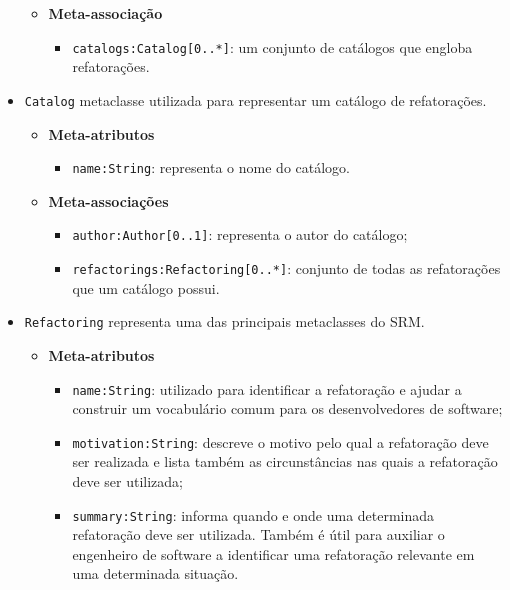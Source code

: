 \begin{itemize}
\begin{itemize}
	\item \textbf{Meta-associação}
		\begin{itemize}
			\item \texttt{catalogs:Catalog[0..*]}: um conjunto de catálogos que engloba refatorações.
		\end{itemize}	
\end{itemize} 

\item \texttt{Catalog} metaclasse utilizada para representar um catálogo de refatorações.

\begin{itemize}
	\item \textbf{Meta-atributos}
		\begin{itemize}
			\item \texttt{name:String}: representa o nome do catálogo. 
		\end{itemize}	
\end{itemize} 

\begin{itemize}
	\item \textbf{Meta-associações}
		\begin{itemize}
			\item \texttt{author:Author[0..1]}: representa o autor do catálogo;
			\item \texttt{refactorings:Refactoring[0..*]}: conjunto de todas as refatorações que um catálogo possui.
		\end{itemize}	
\end{itemize} 

\item \texttt{Refactoring} representa uma das principais metaclasses do SRM.

\begin{itemize}
	\item \textbf{Meta-atributos}
		\begin{itemize}
			\item \texttt{name:String}: utilizado para identificar a refatoração e ajudar a construir um vocabulário comum para os desenvolvedores de software;
			\item \texttt{motivation:String}: descreve o motivo pelo qual a refatoração deve ser realizada e lista também as circunstâncias nas quais a refatoração deve ser utilizada;
			\item \texttt{summary:String}: informa quando e onde uma determinada refatoração deve ser utilizada. Também é útil para auxiliar o engenheiro de software a identificar uma refatoração relevante em uma determinada situação. 
		\end{itemize}	
\end{itemize} 


\end{itemize}
